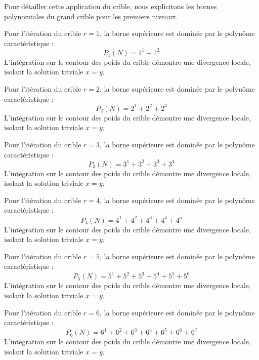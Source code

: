 \documentclass[12pt, a4paper]{article}
\begin{document}
Pour détailler cette application du crible, nous explicitons les bornes polynomiales du grand crible pour les premiers niveaux.


Pour l'itération du crible $r = 1$, la borne supérieure est dominée par le polynôme caractéristique :
\begin{equation}
P_{1}(N) = 1^{1} + 1^{2}
\end{equation}
L'intégration sur le contour des poids du crible démontre une divergence locale, isolant la solution triviale $x=y$.


Pour l'itération du crible $r = 2$, la borne supérieure est dominée par le polynôme caractéristique :
\begin{equation}
P_{2}(N) = 2^{1} + 2^{2} + 2^{3}
\end{equation}
L'intégration sur le contour des poids du crible démontre une divergence locale, isolant la solution triviale $x=y$.


Pour l'itération du crible $r = 3$, la borne supérieure est dominée par le polynôme caractéristique :
\begin{equation}
P_{3}(N) = 3^{1} + 3^{2} + 3^{3} + 3^{4}
\end{equation}
L'intégration sur le contour des poids du crible démontre une divergence locale, isolant la solution triviale $x=y$.


Pour l'itération du crible $r = 4$, la borne supérieure est dominée par le polynôme caractéristique :
\begin{equation}
P_{4}(N) = 4^{1} + 4^{2} + 4^{3} + 4^{4} + 4^{5}
\end{equation}
L'intégration sur le contour des poids du crible démontre une divergence locale, isolant la solution triviale $x=y$.


Pour l'itération du crible $r = 5$, la borne supérieure est dominée par le polynôme caractéristique :
\begin{equation}
P_{5}(N) = 5^{1} + 5^{2} + 5^{3} + 5^{4} + 5^{5} + 5^{6}
\end{equation}
L'intégration sur le contour des poids du crible démontre une divergence locale, isolant la solution triviale $x=y$.


Pour l'itération du crible $r = 6$, la borne supérieure est dominée par le polynôme caractéristique :
\begin{equation}
P_{6}(N) = 6^{1} + 6^{2} + 6^{3} + 6^{4} + 6^{5} + 6^{6} + 6^{7}
\end{equation}
L'intégration sur le contour des poids du crible démontre une divergence locale, isolant la solution triviale $x=y$.
\end{document}
